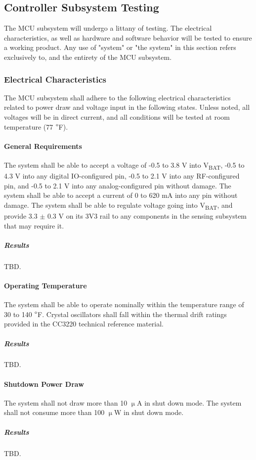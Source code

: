 \subsection{Controller Subsystem Testing}
\label{sec:controller_subsystem_testing}
The MCU subsystem will undergo a littany of testing. The electrical
characteristics, as well as hardware and software behavior will be tested to
ensure a working product. Any use of "system" or "the system" in this section refers exclusively to, and the entirety of the MCU subsystem.

\subsubsection{Electrical Characteristics}
The MCU subsystem shall adhere to the following electrical characteristics
related to power draw and voltage input in the following states. Unless noted,
all voltages will be in direct current, and all conditions will be tested at
room temperature (77 $\degree$F). 

\paragraph{General Requirements} The system shall be able to accept a voltage
of -0.5 to 3.8 V into V\textsubscript{BAT}, -0.5 to 4.3 V into any digital
IO-configured pin, -0.5 to 2.1 V into any RF-configured pin, and -0.5 to 2.1 V
into any analog-configured pin without damage. The system shall be able to
accept a current of 0 to 620 mA into any pin without damage. The system shall
be able to regulate voltage going into V\textsubscript{BAT}, and provide 3.3 $\pm$ 0.3 V
on its 3V3 rail to any components in the sensing
subsystem that may require it.
\subparagraph{Results} TBD.

\paragraph{Operating Temperature} The system shall be able to operate
nominally within the temperature range of 30 to 140 $\degree$F. Crystal
oscillators shall fall within the thermal drift ratings provided in the
CC3220 technical reference material.
\subparagraph{Results} TBD.

\paragraph{Shutdown Power Draw} The system shall not draw more than 10
$\upmu$A in shut down mode. The system shall not consume more than 100
$\upmu$W in shut down mode.
\subparagraph{Results} TBD.


